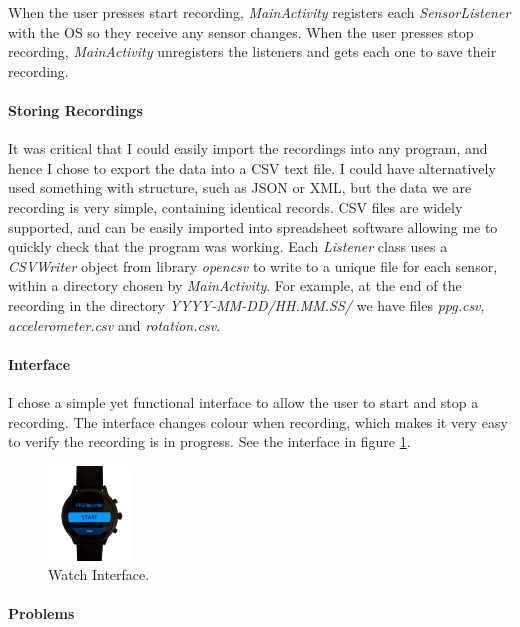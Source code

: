 \documentclass[12pt,a4paper,twoside,openany]{report}
\begin{document}
When the user presses start recording, \emph{MainActivity} registers each
\emph{SensorListener} with the OS so they receive any sensor changes.
When the user presses stop recording, \emph{MainActivity} unregisters the
listeners and gets each one to save their recording.

\paragraph{Storing Recordings}

It was critical that I could easily import the recordings into any program, and
hence I chose to export the data into a CSV text file. I could have
alternatively used something with structure, such as JSON or XML, but the
data we are recording is very simple, containing identical records. CSV files
are widely supported, and can be easily imported into spreadsheet software
allowing me to quickly check that the program was working. Each \emph{Listener}
class uses a \emph{CSVWriter} object from library \emph{opencsv} to write to a
unique file for each sensor, within a directory chosen by \emph{MainActivity}.
For example, at the end of the recording in the directory
\emph{YYYY-MM-DD/HH.MM.SS/} we have files \emph{ppg.csv},
\emph{accelerometer.csv} and \emph{rotation.csv}.

\paragraph{Interface}

I chose a simple yet functional interface to allow the user to start and stop
a recording. The interface changes colour when recording, which makes it very
easy to verify the recording is in progress. See the interface in figure
\ref{fig:interface}.

\begin{figure}[tbh]
	\centerline{\includegraphics[width=0.2\textwidth]{figs/interface.png}}
	\caption{Watch Interface.}
	\label{fig:interface}
\end{figure}



\paragraph{Problems}
\end{document}
